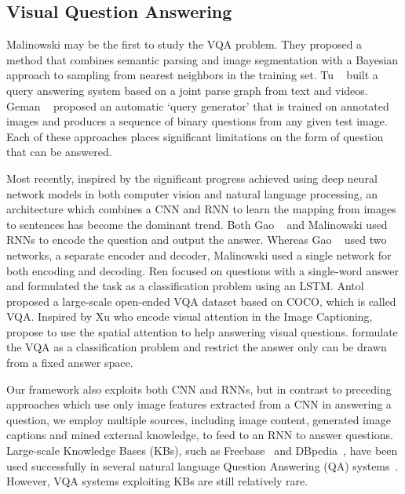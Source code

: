 \subsection{Visual Question Answering} Malinowski \etal \cite{malinowski2014multi}
may be the first to study the VQA problem. They proposed a method that combines semantic parsing and image segmentation with a Bayesian approach to sampling from nearest neighbors in the training set. %
Tu \etal~\cite{tu2014joint} built a query answering system based on a joint parse graph from text and videos. Geman \etal~\cite{geman2015visual} proposed an automatic `query generator' that is trained on annotated images and produces a sequence of binary questions from any given test image. Each of these approaches places significant limitations on the form of question that can be answered.

Most recently, inspired by the significant progress achieved using deep neural network models in both computer vision and natural language processing, an architecture which combines a CNN and RNN to learn the mapping from images to sentences has become the dominant trend. Both Gao \etal~\cite{gao2015you} and Malinowski \etal \cite{malinowski2015ask} used RNNs to encode the question and output the answer.  Whereas Gao \etal~\cite{gao2015you} used two networks, a separate encoder and decoder, Malinowski \etal \cite{malinowski2015ask} used a single network for both encoding and decoding. Ren \etal \cite{ren2015image} focused on questions with a single-word answer and formulated the task as a classification problem using an LSTM. %
Antol \etal \cite{antol2015vqa} proposed a large-scale open-ended VQA dataset based on COCO, which is called VQA. %
Inspired by Xu \etal \cite{xu2015show} who encode visual attention in the Image Captioning, \cite{zhu2015visual7w,xu2015ask,Chen2015ABC,Jiang2015compositional,andreas2015deep,yang2015stacked} propose to use the spatial attention to help answering visual questions. \cite{xu2015ask, yang2015stacked, Noh2015image}
formulate the VQA as a classification problem and restrict the answer only can be drawn from a fixed answer space. %

Our framework also exploits both CNN and RNNs, but in contrast to preceding approaches which use only image features extracted from a CNN in answering a question, we employ multiple sources, including image content, generated image captions and mined external knowledge, to feed to an RNN to answer questions. Large-scale Knowledge Bases (KBs), such as Freebase~\cite{bollacker2008freebase} and DBpedia~\cite{auer2007dbpedia}, have been used successfully in several natural language Question Answering (QA) systems~\cite{berant2013semantic,ferrucci2010building}. However, VQA systems exploiting KBs are still relatively rare.

